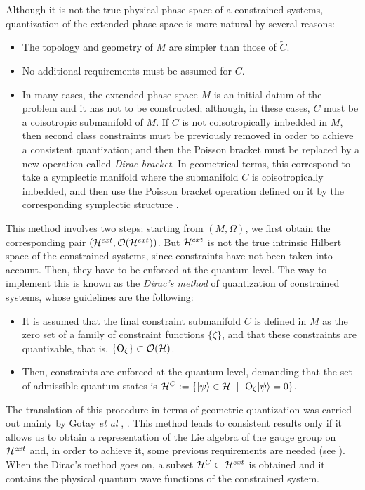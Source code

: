 \documentclass[12pt]{article}
\theoremstyle{plain}
\def\H{{\cal H}}
\def\He{{\cal H}^{ext}}
\def\Hc{{\cal H}^C}
\def\sta{|\psi \rangle }
\def\Op{{\rm O}}
\begin{document}
Although it is not the true physical phase space of a constrained
systems,
quantization of the extended phase space is more natural by several
reasons:
\begin{itemize}
\item
The topology and geometry of $M$ are simpler than those of $\tilde C$.
\item
No additional requirements must be assumed for $C$.
\item
In many cases, the extended phase space $M$ is
an initial datum of the problem and it has not to be constructed;
although, in these cases, $C$ must be a coisotropic submanifold of $M$.
If $C$ is not coisotropically imbedded in $M$, then
second class constraints must be previously removed in order to achieve
a consistent quantization; and then the Poisson bracket must be replaced
by
a new operation called {\it Dirac bracket}.
In geometrical terms, this correspond to take
a symplectic manifold where the submanifold $C$
is coisotropically imbedded, and then use the Poisson bracket
operation defined on it by the corresponding symplectic structure
\cite{Sn-74}.
\end{itemize}
This method involves two steps:
starting from $(M,\Omega )$, we first obtain the corresponding pair
$(\He ,{\cal O}(\He ))$.
But $\He$ is not the true intrinsic Hilbert space of the constrained
systems, since constraints
have not been taken into account. Then, they have to be enforced at the
quantum level.
The way to implement this is known as the
{\it Dirac's method} of quantization of constrained systems,
whose guidelines are the following:
\begin{itemize}
\item
It is assumed that the final constraint submanifold $C$
is defined in $M$ as the zero set of a family of constraint functions
$\{ \zeta \}$,
and that these constraints are quantizable, that is,
$\{ \Op_\zeta \} \subset {\cal O}(\H )$.
\item
Then, constraints are enforced at the quantum level,
demanding that the set of admissible quantum states is
$\Hc := \{ \sta \in \H \ \mid \ \Op_\zeta \sta = 0 \}$.
\end{itemize}

The translation of this procedure in terms of geometric quantization
was carried out mainly by Gotay {\it et al}  \cite{Go-cit},
\cite{GS-81}.
This method leads to consistent results only if
it allows us to obtain a representation of the Lie algebra
of the gauge group on $\He$ and, in order to achieve it,
some previous requirements are needed (see \cite{GS-81}).
When the Dirac's method goes on,
a subset $\Hc \subset \He$ is obtained and it contains
the physical quantum wave functions of the constrained system.
\end{document}
